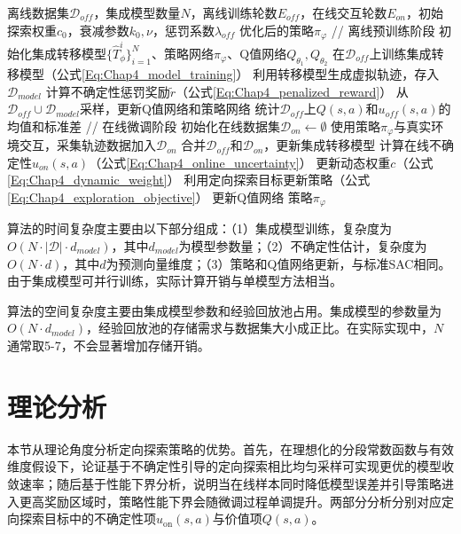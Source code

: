 \begin{algorithm}[htbp]
  \caption{基于定向探索模型的离线到在线强化学习算法}
  \label{Alg:Chap4_DEM}
  \begin{algorithmic}[1]
    \Require 离线数据集$\mathcal{D}_{off}$，集成模型数量$N$，离线训练轮数$E_{off}$，在线交互轮数$E_{on}$，初始探索权重$c_0$，衰减参数$k_0, \nu$，惩罚系数$\lambda_{off}$
    \Ensure 优化后的策略$\pi_\varphi$
    \State // 离线预训练阶段
    \State 初始化集成转移模型$\{\hat{T}_\phi^i\}_{i=1}^N$、策略网络$\pi_\varphi$、Q值网络$Q_{\theta_1}, Q_{\theta_2}$
    \State 在$\mathcal{D}_{off}$上训练集成转移模型（公式\ref{Eq:Chap4_model_training}）
    \State 利用转移模型生成虚拟轨迹，存入$\mathcal{D}_{model}$
    \State 计算不确定性惩罚奖励$\tilde{r}$（公式\ref{Eq:Chap4_penalized_reward}）
    \State 从$\mathcal{D}_{off} \cup \mathcal{D}_{model}$采样，更新Q值网络和策略网络
    \EndFor
    \State 统计$\mathcal{D}_{off}$上$Q(s,a)$和$u_{off}(s,a)$的均值和标准差
    \State // 在线微调阶段
    \State 初始化在线数据集$\mathcal{D}_{on} \leftarrow \emptyset$
    \State 使用策略$\pi_\varphi$与真实环境交互，采集轨迹数据加入$\mathcal{D}_{on}$
    \State 合并$\mathcal{D}_{off}$和$\mathcal{D}_{on}$，更新集成转移模型
    \State 计算在线不确定性$u_{on}(s,a)$（公式\ref{Eq:Chap4_online_uncertainty}）
    \State 更新动态权重$c$（公式\ref{Eq:Chap4_dynamic_weight}）
    \State 利用定向探索目标更新策略（公式\ref{Eq:Chap4_exploration_objective}）
    \State 更新Q值网络
    \EndFor
    \State \Return 策略$\pi_\varphi$
  \end{algorithmic}
\end{algorithm}

算法的时间复杂度主要由以下部分组成：（1）集成模型训练，复杂度为$O(N \cdot |\mathcal{D}| \cdot d_{model})$，其中$d_{model}$为模型参数量；（2）不确定性估计，复杂度为$O(N \cdot d)$，其中$d$为预测向量维度；（3）策略和Q值网络更新，与标准SAC相同。由于集成模型可并行训练，实际计算开销与单模型方法相当。

算法的空间复杂度主要由集成模型参数和经验回放池占用。集成模型的参数量为$O(N \cdot d_{model})$，经验回放池的存储需求与数据集大小成正比。在实际实现中，$N$通常取5-7，不会显著增加存储开销。

\section{理论分析}\label{Sec4.3}

本节从理论角度分析定向探索策略的优势。首先，在理想化的分段常数函数与有效维度假设下，论证基于不确定性引导的定向探索相比均匀采样可实现更优的模型收敛速率；随后基于性能下界分析，说明当在线样本同时降低模型误差并引导策略进入更高奖励区域时，策略性能下界会随微调过程单调提升。两部分分析分别对应定向探索目标中的不确定性项$u_{\mathrm{on}}(s,a)$与价值项$Q(s,a)$。

